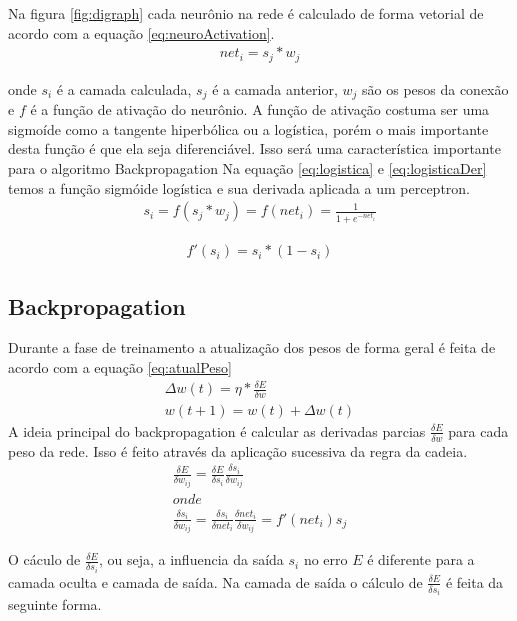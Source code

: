 \documentclass[
	article,			%
	11pt,				%
	oneside,			%
	a4paper,			%
	english,			%
	brazil,				%
	sumario=tradicional
	]{abntex2}
\begin{document}
Na figura \ref{fig:digraph} cada neurônio na rede é calculado de forma
vetorial de acordo com a equação \ref{eq:neuroActivation}. 
\begin{align}
	net_i=s_j*w_j
\label{eq:neuroActivation}
\end{align}

onde $s_i$ é a camada calculada, $s_j$ é a camada anterior, $w_j$ são os pesos
da conexão e $f$ é a função de ativação do neurônio. A função de ativação
costuma ser uma sigmoíde como a tangente hiperbólica ou a logística, porém o
mais importante desta função é que ela seja diferenciável. Isso será uma
característica importante para o algoritmo Backpropagation Na equação
\ref{eq:logistica} e \ref{eq:logisticaDer} temos a função sigmóide logística e
sua derivada aplicada a um perceptron.
\begin{align}
	s_i=f(s_j*w_j)=f(net_i)=\frac{1}{1+e^{-net_i}}
\label{eq:logistica}
\end{align}

\begin{align}
	f'(s_i)=s_i*(1-s_i)
\label{eq:logisticaDer}
\end{align} 

\subsection{Backpropagation}
Durante a fase de treinamento a atualização dos pesos de forma geral é feita de
acordo com a equação \ref{eq:atualPeso}
\begin{align}
	\Delta w(t)= \eta*\frac{\delta E}{\delta w} \\
	w(t+1)=w(t)+\Delta w(t)
\label{eq:atualPeso}
\end{align}
A ideia principal do backpropagation é calcular as derivadas parcias
$\frac{\delta E}{\delta w}$ para cada peso da rede. Isso é feito através da
aplicação sucessiva da regra da cadeia.
\begin{align}
\frac{\delta E}{\delta w_{ij}}=
\frac{\delta E}{\delta s_i}
\frac{\delta s_i}{\delta w_{ij}}
\\ onde \\
\frac{\delta s_i}{\delta w_{ij}}=
\frac{\delta s_i}{\delta net_i}
\frac{\delta net_i}{\delta w_{ij}}=
f'(net_i)s_j
\end{align}

O cáculo de $\frac{\delta E}{\delta s_i}$, ou seja, a influencia da saída
$s_i$ no erro $E$ é diferente para a camada oculta e camada de saída.
Na camada de saída o cálculo de $\frac{\delta E}{\delta s_i}$ é feita da
seguinte forma.
\end{document}
